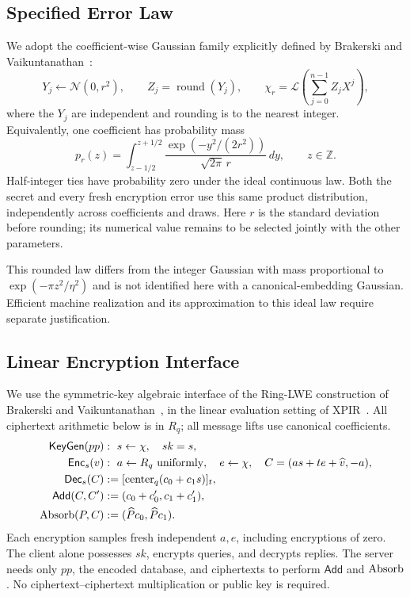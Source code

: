 \subsection{Specified Error Law}
We adopt the coefficient-wise Gaussian family explicitly defined by
Brakerski and Vaikuntanathan~\cite[Sec.~1.3]{homomorphic}:
\[
 Y_j\leftarrow\mathcal N(0,r^2),\qquad
 Z_j=\operatorname{round}(Y_j),\qquad
 \chi_r=\mathcal L\!\left(\sum_{j=0}^{n-1}Z_jX^j\right),
\]
where the \(Y_j\) are independent and rounding is to the nearest integer.
Equivalently, one coefficient has probability mass
\[
 p_r(z)=\int_{z-1/2}^{z+1/2}
       \frac{\exp(-y^2/(2r^2))}{\sqrt{2\pi}\,r}\,dy,\qquad z\in\mathbb Z.
\]
Half-integer ties have probability zero under the ideal continuous law.
Both the secret and every fresh encryption error use this same
product distribution, independently across coefficients and draws.
Here \(r\) is the standard deviation before rounding; its numerical value
remains to be selected jointly with the other parameters.


This rounded law differs from the integer Gaussian with mass proportional
to \(\exp(-\pi z^2/\eta^2)\) and is not identified here with a
canonical-embedding Gaussian. Efficient machine realization and its
approximation to this ideal law require separate justification.

\subsection{Linear Encryption Interface}
\label{sec:prelim}
We use the symmetric-key algebraic interface of the Ring-LWE construction
of Brakerski and Vaikuntanathan~\cite{homomorphic}, in the linear evaluation
setting of XPIR~\cite{melchor2016xpir}. All ciphertext arithmetic below is in
\(R_q\); all message lifts use canonical coefficients.
\begin{align*}
 \mathsf{KeyGen}(pp)&:\ s\leftarrow\chi,\quad sk=s,\\
 \mathsf{Enc}_s(v)&:\ a\leftarrow R_q\text{ uniformly},\quad e\leftarrow\chi,
   \quad C=(as+te+\widehat v,-a),\\
 \mathsf{Dec}_s(C)&:=
   [\operatorname{center}_q(c_0+c_1s)]_t,\\
 \mathsf{Add}(C,C')&:=(c_0+c'_0,c_1+c'_1),\\
 \mathrm{Absorb}(P,C)&:=(\widehat P c_0,\widehat P c_1).
\end{align*}
Each encryption samples fresh independent \(a,e\), including encryptions of
zero. The client alone possesses \(sk\), encrypts queries, and decrypts
replies. The server needs only \(pp\), the encoded database, and ciphertexts
to perform \(\mathsf{Add}\) and \(\mathrm{Absorb}\). No ciphertext--ciphertext
multiplication or public key is required.

